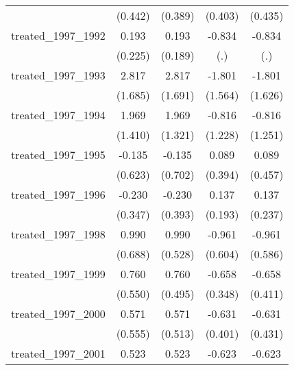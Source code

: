{\begin{tabular}{l*{4}{c}}
            &     (0.442)         &     (0.389)         &     (0.403)         &     (0.435)         \\
[1em]
treated\_1997\_1992&       0.193         &       0.193         &      -0.834         &      -0.834         \\
            &     (0.225)         &     (0.189)         &         (.)         &         (.)         \\
[1em]
treated\_1997\_1993&       2.817         &       2.817         &      -1.801         &      -1.801         \\
            &     (1.685)         &     (1.691)         &     (1.564)         &     (1.626)         \\
[1em]
treated\_1997\_1994&       1.969         &       1.969         &      -0.816         &      -0.816         \\
            &     (1.410)         &     (1.321)         &     (1.228)         &     (1.251)         \\
[1em]
treated\_1997\_1995&      -0.135         &      -0.135         &       0.089         &       0.089         \\
            &     (0.623)         &     (0.702)         &     (0.394)         &     (0.457)         \\
[1em]
treated\_1997\_1996&      -0.230         &      -0.230         &       0.137         &       0.137         \\
            &     (0.347)         &     (0.393)         &     (0.193)         &     (0.237)         \\
[1em]
treated\_1997\_1998&       0.990         &       0.990         &      -0.961         &      -0.961         \\
            &     (0.688)         &     (0.528)         &     (0.604)         &     (0.586)         \\
[1em]
treated\_1997\_1999&       0.760         &       0.760         &      -0.658         &      -0.658         \\
            &     (0.550)         &     (0.495)         &     (0.348)         &     (0.411)         \\
[1em]
treated\_1997\_2000&       0.571         &       0.571         &      -0.631         &      -0.631         \\
            &     (0.555)         &     (0.513)         &     (0.401)         &     (0.431)         \\
[1em]
treated\_1997\_2001&       0.523         &       0.523         &      -0.623         &      -0.623         \\

\end{tabular}}
